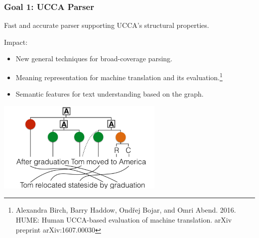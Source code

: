 \documentclass[t]{beamer}
\begin{document}
\begin{frame}
\frametitle{Goal 1: UCCA Parser}
Fast and accurate parser supporting UCCA's structural properties.

\vspace*{\fill}
Impact:
\begin{itemize}
\item New general techniques for broad-coverage parsing.
\item Meaning representation for machine translation and its evaluation.\footnote{
Alexandra Birch, Barry Haddow, Ond\v{r}ej Bojar, and Omri Abend. 2016. HUME: Human UCCA-based
evaluation of machine translation. arXiv preprint arXiv:1607.00030}
\item Semantic features for text understanding based on the graph.

\vspace*{\fill}
\end{itemize}
\begin{center}
 \includegraphics[width=0.6\textwidth,keepaspectratio]{hume}
\end{center}
\end{frame}
\end{document}
